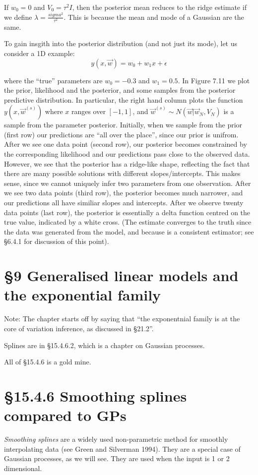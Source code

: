 \documentclass{amsart}
\begin{document}
If $w_0 = 0$ and $V_0 = \tau^2 I$, then the posterior mean reduces to the ridge estimate
if we define $\lambda = \frac{sigma^2}{\tau^2}$. This is because the mean and mode of a 
Gaussian are the same.

To gain insgith into the posterior distribution (and not just its mode), let us consider a
1D example:
\[
y(x, \vec{w}) = w_0 + w_1 x + \epsilon
\]

where the ``true'' parameters are $w_0 = -0.3$ and $w_1 = 0.5$. In Figure 7.11 we plot the
prior, likelihood and the posterior, and some samples from the posterior predictive
distribution. In particular, the right hand column plots the function $y(x, \vec{w}^{(s)})$
where $x$ ranges over $[-1, 1]$, and $\vec{w}^{(s)} \sim N(\vec{w} | \vec{w}_N, V_N)$ is a
sample from the parameter posterior. Initially, when we sample from the prior (first row)
our predictions are ``all over the place'', since our prior is unifrom. After we see one
data point (second row), our posterior becomes constrained by the corresponding likelihood
and our predictions pass close to the observed data. However, we see that the posterior has
a ridge-like shape, reflecting the fact that there are many possible solutions with
different slopes/intercepts. This makes sense, since we cannot uniquely infer two parameters
from one observation. After we see two data points (third row), the posterior becomes
much narrower, and our predictions all have similiar slopes and intercepts. After we observe
twenty data points (last row), the posterior is essentially a delta function centred on
the true value, indicated by a white cross. (The estimate converges to the truth since the data was generated from the model, and because is a consistent estimator; see \S 6.4.1
for discussion of this point).

\section{\S 9 Generalised linear models and the exponential family}
Note: The chapter starts off by saying that ``the exponentnial family is at the core
of variation inference, as discussed in \S 21.2''.

Splines are in \S 15.4.6.2, which is a chapter on Gaussian processes.

All of \S 15.4.6 is a gold mine.

\section{\S 15.4.6 Smoothing splines compared to GPs}
\emph{Smoothing splines} are a widely used non-parametric method for smoothly interpolating
data (see Green and Silverman 1994). They are a special case of Gaussian processes, as we
will see. They are used when the input is 1 or 2 dimensional.
\end{document}
